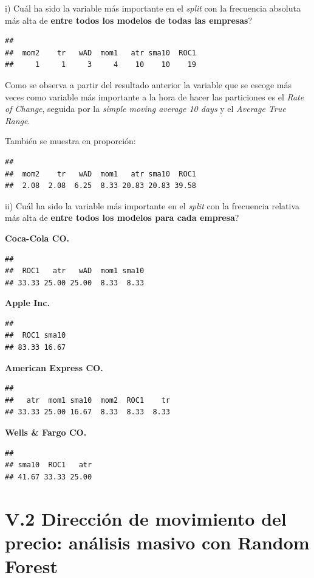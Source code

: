 \documentclass[]{DissertateUSU}
\begin{document}
\noindent i) Cuál ha sido la variable más importante en el \emph{split}
con la frecuencia absoluta más alta de \textbf{entre todos los modelos
de todas las empresas}?

\begin{verbatim}
## 
##  mom2    tr   wAD  mom1   atr sma10  ROC1 
##     1     1     3     4    10    10    19
\end{verbatim}

Como se observa a partir del resultado anterior la variable que se
escoge más veces como variable más importante a la hora de hacer las
particiones es el \emph{Rate of Change}, seguida por la \emph{simple
moving average 10 days} y el \emph{Average True Range}.

También se muestra en proporción:

\begin{verbatim}
## 
##  mom2    tr   wAD  mom1   atr sma10  ROC1 
##  2.08  2.08  6.25  8.33 20.83 20.83 39.58
\end{verbatim}

\noindent ii) Cuál ha sido la variable más importante en el \emph{split}
con la frecuencia relativa más alta de \textbf{entre todos los modelos
para cada empresa}?

\textbf{Coca-Cola CO.}

\begin{verbatim}
## 
##  ROC1   atr   wAD  mom1 sma10 
## 33.33 25.00 25.00  8.33  8.33
\end{verbatim}

\textbf{Apple Inc.}

\begin{verbatim}
## 
##  ROC1 sma10 
## 83.33 16.67
\end{verbatim}

\textbf{American Express CO.}

\begin{verbatim}
## 
##   atr  mom1 sma10  mom2  ROC1    tr 
## 33.33 25.00 16.67  8.33  8.33  8.33
\end{verbatim}

\textbf{Wells \& Fargo CO.}

\begin{verbatim}
## 
## sma10  ROC1   atr 
## 41.67 33.33 25.00
\end{verbatim}

\FloatBarrier
{}
\fancyfoot[C]{\thepage}

\section{V.2 \textbf{Dirección de movimiento del precio: análisis masivo con Random Forest}}
\end{document}
